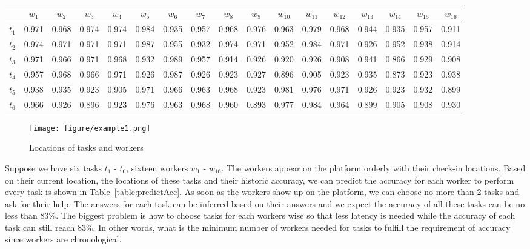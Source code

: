 \begin{table*}[t]
	\centering
	\caption{each work's predicted accuracy for each tasks}
	\label{table:predictAcc}
	\begin{tabular}{|c|c|c|c|c|c|c|c|c|c|c|c|c|c|c|c|c|}
		\hline
		\quad &$w_1$ &$w_2$ &$w_3$ &$w_4$ &$w_5$ &$w_6$ &$w_7$ &$w_8$ &$w_9$ &$w_{10}$ &$w_{11}$ &$w_{12}$ &$w_{13}$ &$w_{14}$ &$w_{15}$ &$w_{16}$ \\
		\hline
		$t_1$ &0.971 &0.968 &0.974 &0.974 &0.984 &0.935 &0.957 &0.968 &0.976 &0.963 &0.979 &0.968 &0.944 &0.935 &0.957 &0.911 \\
		\hline
		$t_2$ &0.974 &0.971 &0.971 &0.971 &0.987 &0.955 &0.932 &0.974 &0.971 &0.952 &0.984 &0.971 &0.926 &0.952 &0.938 &0.914 \\
		\hline
		$t_3$ &0.971 &0.966 &0.971 &0.968 &0.932 &0.989 &0.957 &0.914 &0.926 &0.920 &0.926 &0.908 &0.941 &0.866 &0.929 &0.908  \\
		\hline
		$t_4$ &0.957 &0.968 &0.966 &0.971 &0.926 &0.987 &0.926 &0.923 &0.927 &0.896 &0.905 &0.923 &0.935 &0.873 &0.923 &0.938 \\
		\hline
		$t_5$ &0.938 &0.935 &0.923 &0.905 &0.971 &0.966 &0.963 &0.968 &0.923 &0.981 &0.976 &0.971 &0.926 &0.923 &0.932 &0.899 \\
		\hline
		$t_6$ &0.966 &0.926 &0.896 &0.923 &0.976 &0.963 &0.968 &0.960 &0.893 &0.977 &0.984 &0.964 &0.899 &0.905 &0.908 &0.930   \\
		\hline
	\end{tabular}
\end{table*}

\begin{figure}[t]
	\center
	\texttt{[image: figure/example1.png]}
	\caption{Locations of tasks and workers}
	\vspace{-3ex}
	\label{fig:gym}
\end{figure}

\begin{example} 
\label{exa:introExa}
Suppose we have six tasks $t_1$ - $t_6$, sixteen workers $w_1$ - $w_{16}$.
The workers appear on the platform orderly with their check-in locations.
Based on their current location, the locations of these tasks and their historic accuracy,
we can predict the accuracy for each worker to perform every task is shown in Table~\ref{table:predictAcc}.
As soon as the workers show up on the platform, we can choose no more than 2 tasks and ask for their help.
The answers for each task can be inferred based on their answers and 
we expect the accuracy of all these tasks can be no less than 83\%.
The biggest problem is 
how to choose tasks for each workers wise so that less latency is needed while
the accuracy of each task can still reach 83\%.
In other words, what is the minimum number of workers needed for tasks to fulfill the requirement of accuracy
since workers are chronological.
\end{example}

